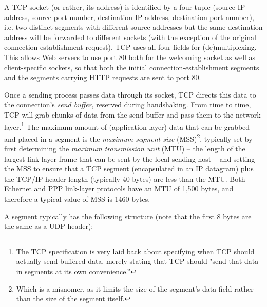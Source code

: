\documentclass[table, xcdraw]{article}%
\begin{document}
A TCP socket (or rather, its address) is identified by a four-tuple (source IP address, source port number, destination IP address, destination port number), i.e. two distinct segments with different source addresses but the same destination address will be forwarded to different sockets (with the exception of the original connection-establishment request). TCP uses all four fields for (de)multiplexing. This allows Web servers to use port 80 both for the welcoming socket as well as client-specific sockets, so that both the initial connection-establishment segments and the segments carrying HTTP requests are sent to port 80.

Once a sending process passes data through its socket, TCP directs this data to the connection's \emph{send buffer}, reserved during handshaking. From time to time, TCP will grab chunks of data from the send buffer and pass them to the network layer.\footnote{The TCP specification is very laid back about specifying when TCP should actually send buffered data, merely stating that TCP should "send that data in segments at its own convenience.”} The maximum amount of (application-layer) data that can be grabbed and placed in a segment is the \emph{maximum segment size} (MSS)\footnote{Which is a misnomer, as it limits the size of the segment's data field rather than the size of the segment itself.}, typically set by first determining the \emph{maximum transmission unit} (MTU) -- the length of the largest link-layer frame that can be sent by the local sending host -- and setting the MSS to ensure that a TCP segment (encapsulated in an IP datagram) plus the TCP/IP header length (typically 40 bytes) are less than the MTU. Both Ethernet and PPP link-layer protocols have an MTU of 1,500 bytes, and therefore a typical value of MSS is 1460 bytes.

A segment typically has the following structure (note that the first 8 bytes are the same as a UDP header):
\end{document}
